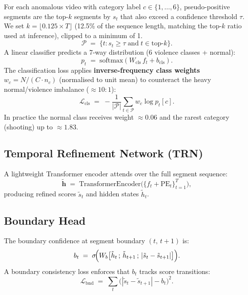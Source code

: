 \documentclass[11pt]{article}
\begin{document}
For each anomalous video with category label $c\in\{1,\ldots,6\}$,
pseudo-positive segments are the top-$k$ segments by $s_t$ that also
exceed a confidence threshold $\tau$.
We set $k = \lfloor 0.125 \times T \rfloor$ (12.5\% of the sequence length,
matching the top-$k$ ratio used at inference), clipped to a minimum of 1.
\begin{equation}
  \mathcal{P} \;=\; \bigl\{t : s_t \geq \tau \;\text{and}\;
                    t \in \mathrm{top}\text{-}k\bigr\}.
\end{equation}
A linear classifier predicts a 7-way distribution (6 violence classes + normal):
\begin{equation}
  p_t \;=\; \mathrm{softmax}(W_\mathrm{cls}\,f_t + b_\mathrm{cls}).
\end{equation}
The classification loss applies \textbf{inverse-frequency class weights}
$w_c = N/(C \cdot n_c)$ (normalised to unit mean) to counteract
the heavy normal/violence imbalance (${\approx}10{:}1$):
\begin{equation}
  \mathcal{L}_\mathrm{cls} \;=\;
    -\frac{1}{|\mathcal{P}|}\sum_{t\in\mathcal{P}} w_c \log p_t[c].
\end{equation}
In practice the normal class receives weight ${\approx}0.06$ and the
rarest category (shooting) up to ${\approx}1.83$.

\subsection{Temporal Refinement Network (TRN)}

A lightweight Transformer encoder attends over the full segment sequence:
\begin{equation}
  \tilde{\mathbf{h}} \;=\;
    \mathrm{TransformerEncoder}\!\bigl(\{f_t + \mathrm{PE}_t\}_{t=1}^{T}\bigr),
\end{equation}
producing refined scores $\tilde{s}_t$ and hidden states $\tilde{h}_t$.

\subsection{Boundary Head}

The boundary confidence at segment boundary $(t,\,t{+}1)$ is:
\begin{equation}
  b_t \;=\; \sigma\!\Bigl(W_b\bigl[
      \tilde{h}_t\,;\,\tilde{h}_{t+1}\,;\,|\tilde{s}_t-\tilde{s}_{t+1}|
    \bigr]\Bigr).
\end{equation}
A boundary consistency loss enforces that $b_t$ tracks score transitions:
\begin{equation}
  \mathcal{L}_\mathrm{bnd} \;=\;
    \sum_t \bigl(|\tilde{s}_t - \tilde{s}_{t+1}| - b_t\bigr)^2.
\end{equation}
\end{document}
